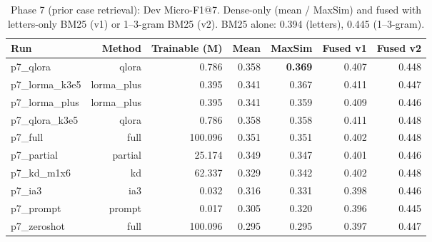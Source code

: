 \begin{table}[t]
\centering\small
\begin{tabular}{lrrrrrr}
\toprule
Run & Method & Trainable (M) & Mean & MaxSim & Fused v1 & Fused v2 \\
\midrule
p7\_qlora & qlora & 0.786 & 0.358 & \textbf{0.369} & 0.407 & 0.448 \\
p7\_lorma\_k3e5 & lorma\_plus & 0.395 & 0.341 & 0.367 & 0.411 & 0.447 \\
p7\_lorma\_plus & lorma\_plus & 0.395 & 0.341 & 0.359 & 0.409 & 0.446 \\
p7\_qlora\_k3e5 & qlora & 0.786 & 0.358 & 0.358 & 0.411 & 0.448 \\
p7\_full & full & 100.096 & 0.351 & 0.351 & 0.402 & 0.448 \\
p7\_partial & partial & 25.174 & 0.349 & 0.347 & 0.401 & 0.446 \\
p7\_kd\_m1x6 & kd & 62.337 & 0.329 & 0.342 & 0.402 & 0.448 \\
p7\_ia3 & ia3 & 0.032 & 0.316 & 0.331 & 0.398 & 0.446 \\
p7\_prompt & prompt & 0.017 & 0.305 & 0.320 & 0.396 & 0.445 \\
p7\_zeroshot & full & 100.096 & 0.295 & 0.295 & 0.397 & 0.447 \\
\bottomrule
\end{tabular}
\caption{Phase 7 (prior case retrieval): Dev Micro-F1@7. Dense-only (mean / MaxSim) and fused with letters-only BM25 (v1) or 1--3-gram BM25 (v2). BM25 alone: 0.394 (letters), 0.445 (1--3-gram).}
\label{tab:p7}
\end{table}
